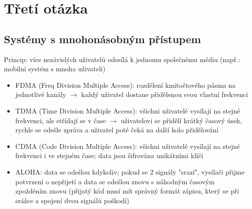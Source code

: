 \chapter{Třetí otázka}
\section{Systémy s mnohonásobným přístupem}
Princip: více nezávislých uživatelů odesílá k jednomu společnému médiu (např.: mobilní systém s mnoha uživateli)
\begin{itemize}
	\item FDMA (Freq Division Multiple Access): rozdělení kmitočtového pásma na jednotlivé kanály $\rightarrow$ každý uživatel dostane přidělenou svou vlastní frekvenci
	\item TDMA (Time Division Multiple Access): všichni uživatelé vysílají na stejné frekvenci, ale střídají se v čase $\rightarrow$ uživatelovi se přidělí krátký časový úsek, rychle se odešle zpráva a uživatel poté čeká na další kolo přidělování
	\item CDMA (Code Division Multiple Access): všichni uživatelé vysílají na stejné frekvenci i ve stejném čase; data jsou šifrována unikátními klíči 
	\item ALOHA: data se odešlou kdykoliv; pokud se 2 signály "srazí", vysílači přijme potvrzení o nepřijetí a data se odešlou znovu s náhodným časovým zpožděním znovu (přijatý kód musí mít správný formát zápisu, který se při srážce a spojení dvou signálů poškodí)
\end{itemize}

